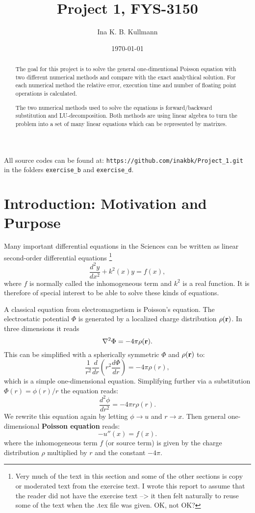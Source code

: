 \documentclass[11pt,a4wide]{article}
\title{Project 1, FYS-3150}
\author{Ina K. B. Kullmann}
\date{\today}
\begin{document}
\maketitle

{\scriptsize \noindent All source codes can be found at: \texttt{https://github.com/inakbk/Project\_1.git} in the folders \texttt{exercise\_b} and \texttt{exercise\_d}. }


\begin{abstract}
The goal for this project is to solve the general one-dimentional Poisson equation with two different numerical methods and compare with the exact analythical solution. For each numerical method the relative error, execution time and number of floating point operations is calculated.

The two numerical methods used to solve the equations is forward/backward substitution and LU-decomposition. Both methods are using linear algebra to turn the problem into a set of many linear equations which can be represented by matrixes. 


\end{abstract}



\section{Introduction: Motivation and Purpose}


Many important differential equations in the Sciences can be written as linear second-order differential equations \footnote{Very much of the text in this section and some of the other sections is copy or moderated text from the exercise text. I wrote this report to assume that the reader did not have the exercise text --> it then felt naturally to reuse some of the text when the .tex file was given. OK, not OK?}
\[
\frac{d^2y}{dx^2}+k^2(x)y = f(x),
\]
where $f$ is normally called the inhomogeneous term and $k^2$ is a real function. It is therefore of special interest to be able to solve these kinds of equations. 

A classical equation from electromagnetism is Poisson's equation. The electrostatic potential $\Phi$ is generated by a localized charge distribution $\rho ({\bf r})$.   In three dimensions it reads
\[
\nabla^2 \Phi = -4\pi \rho ({\bf r}).
\]
This can be simplified with a spherically symmetric $\Phi$ and $\rho ({\bf r})$ to:
\[
\frac{1}{r^2}\frac{d}{dr}\left(r^2\frac{d\Phi}{dr}\right) = -4\pi \rho(r),
\]
which is a simple one-dimensional equation. Simplifying further via a substitution $\Phi(r)= \phi(r)/r$ the equation reads:
\[
\frac{d^2\phi}{dr^2}= -4\pi r\rho(r).
\]
We rewrite this equation again by letting $\phi\rightarrow u$ and 
$r\rightarrow x$. Then general one-dimensional \textbf{Poisson equation} reads:
\begin{equation}
-u''(x) = f(x). 
\label{eq:Poisson}
\end{equation}
where the inhomogeneous term $f$ (or source term) is given by the charge distribution $\rho$  multiplied by $r$ and the constant $-4\pi$.
\end{document}
